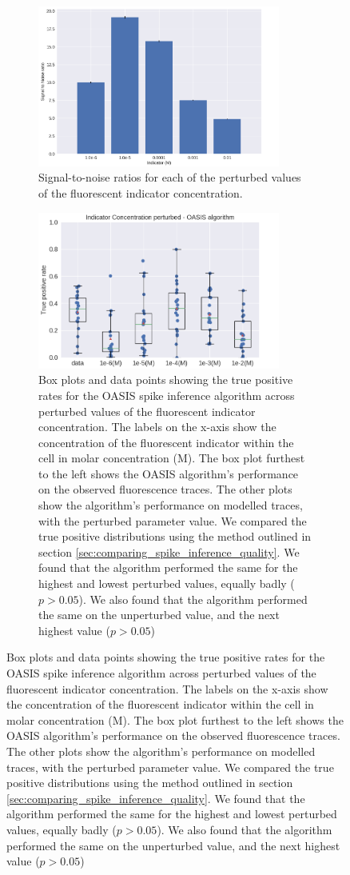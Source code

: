 \documentclass[a4paper,12pt]{article}
\theoremstyle{definition}
\begin{document}
\begin{figure}[p]
  \begin{subfigure}{\textwidth}
    \centering
    \includegraphics[width=0.875\textwidth]{figures/indicator_perturbed_snr.png}
    \caption{Signal-to-noise ratios for each of the perturbed values of the fluorescent indicator concentration.}
    \label{fig:indicator_perturbed_snr.png}
  \end{subfigure}
  \begin{subfigure}{\textwidth}
    \centering
    \includegraphics[width=0.875\textwidth]{figures/indictor_perturbed_oasis_first.png}
    \caption{Box plots and data points showing the true positive rates for the OASIS spike inference algorithm across perturbed values of the fluorescent indicator concentration. The labels on the x-axis show the concentration of the fluorescent indicator within the cell in molar concentration (M). The box plot furthest to the left shows the OASIS algorithm's performance on the observed fluorescence traces. The other plots show the algorithm's performance on modelled traces, with the perturbed parameter value. We compared the true positive distributions using the method outlined in section \ref{sec:comparing_spike_inference_quality}. We found that the algorithm performed the same for the highest and lowest perturbed values, equally badly ($p > 0.05$). We also found that the algorithm performed the same on the unperturbed value, and the next highest value ($p > 0.05$)}

\end{subfigure}
\end{figure}
\end{document}
